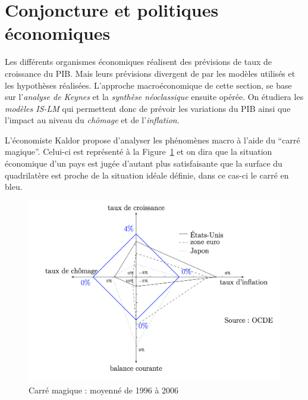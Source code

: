 \section{Conjoncture et politiques économiques} %
\label{prt:conjoncture_et_politiques_economiques}

Les différents organismes économiques réalisent des prévisions de taux de croissance du PIB. Mais leurs prévisions divergent de par les modèles utilisés et 
les hypothèses réalisées.
L'approche macroéconomique de cette section, se base sur l'\emph{analyse de Keynes} 
et la \emph{synthèse néoclassique} ensuite opérée. 
On étudiera les \emph{modèles IS-LM} qui permettent donc de prévoir
les variations du PIB ainsi que l'impact au niveau du \emph{chômage} et de l'\emph{inflation}. 

L'économiste Kaldor propose d'analyser les phénomènes macro à l'aide du ``carré magique''.
Celui-ci est représenté à la Figure~\ref{fig:carre_magique} et on dira que la situation
économique d'un pays est jugée d'autant plus satisfaisante que la surface du quadrilatère
est proche de la situation idéale définie, dans ce cas-ci le carré en bleu.

\begin{figure}[h]
	\begin{center}
		\includegraphics[scale=0.5]{./img/im2}
	\end{center}
	\caption{Carré magique : moyenné de 1996 à 2006}
  \label{fig:carre_magique}
\end{figure}

